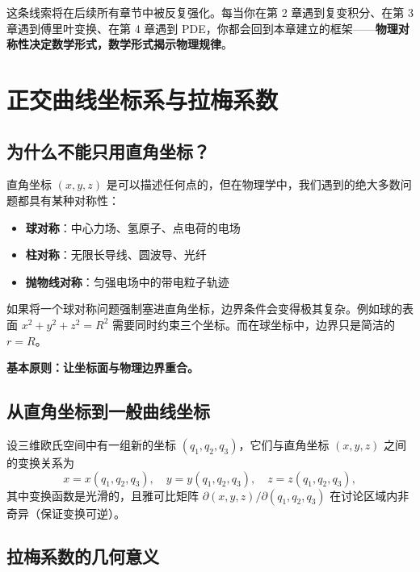 \begin{center}
\end{center}

这条线索将在后续所有章节中被反复强化。每当你在第 2 章遇到复变积分、在第 3 章遇到傅里叶变换、在第 4 章遇到 PDE，你都会回到本章建立的框架——\textbf{物理对称性决定数学形式，数学形式揭示物理规律}。

\section{正交曲线坐标系与拉梅系数}

\subsection{为什么不能只用直角坐标？}

直角坐标 $(x,y,z)$ 是可以描述任何点的，但在物理学中，我们遇到的绝大多数问题都具有某种对称性：

\begin{itemize}
  \item \textbf{球对称}：中心力场、氢原子、点电荷的电场
  \item \textbf{柱对称}：无限长导线、圆波导、光纤
  \item \textbf{抛物线对称}：匀强电场中的带电粒子轨迹
\end{itemize}

如果将一个球对称问题强制塞进直角坐标，边界条件会变得极其复杂。例如球的表面 $x^2+y^2+z^2=R^2$ 需要同时约束三个坐标。而在球坐标中，边界只是简洁的 $r=R$。

\textbf{基本原则：让坐标面与物理边界重合。}

\subsection{从直角坐标到一般曲线坐标}

设三维欧氏空间中有一组新的坐标 $(q_1,q_2,q_3)$，它们与直角坐标 $(x,y,z)$ 之间的变换关系为
\begin{equation}
x = x(q_1,q_2,q_3),\quad
y = y(q_1,q_2,q_3),\quad
z = z(q_1,q_2,q_3),
\label{eq:general_transform}
\end{equation}
其中变换函数是光滑的，且雅可比矩阵 $\partial(x,y,z)/\partial(q_1,q_2,q_3)$ 在讨论区域内非奇异（保证变换可逆）。

\subsection{拉梅系数的几何意义}

